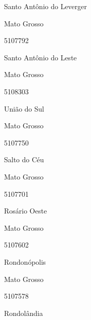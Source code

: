 \documentclass[
  letterpaper,
]{report}
\begin{document}
\n      

Santo Antônio do Leverger

\n    

\n    

\n      

Mato Grosso

\n      

5107792

\n      

Santo Antônio do Leste

\n    

\n    

\n      

Mato Grosso

\n      

5108303

\n      

União do Sul

\n    

\n    

\n      

Mato Grosso

\n      

5107750

\n      

Salto do Céu

\n    

\n    

\n      

Mato Grosso

\n      

5107701

\n      

Rosário Oeste

\n    

\n    

\n      

Mato Grosso

\n      

5107602

\n      

Rondonópolis

\n    

\n    

\n      

Mato Grosso

\n      

5107578

\n      

Rondolândia

\n    

\n    
\end{document}
